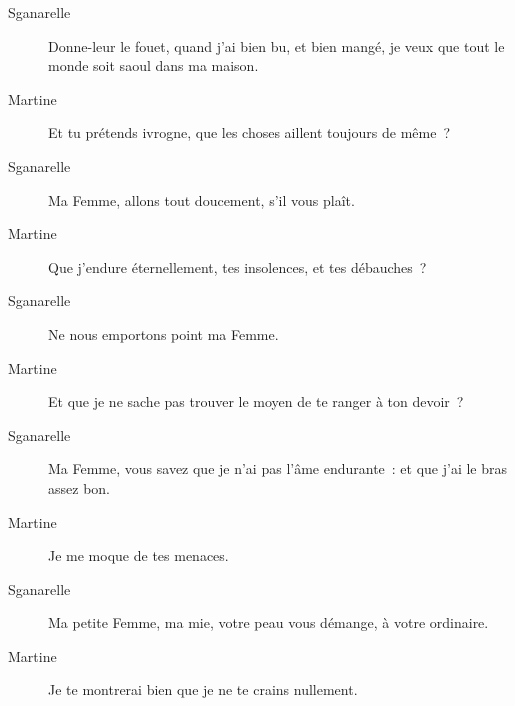\documentclass[french,twoside]{book} %
\begin{document}
 \begin{description} \item[Sganarelle] 

Donne-leur le fouet, quand j’ai bien bu, et bien mangé, je veux que tout le monde soit saoul dans ma maison.\end{description}
 \begin{description} \item[Martine] 

Et tu prétends ivrogne, que les choses aillent toujours de même ?\end{description}
 \begin{description} \item[Sganarelle] 

Ma Femme, allons tout doucement, s’il vous plaît.\end{description}
 \begin{description} \item[Martine] 

Que j’endure éternellement, tes insolences, et tes débauches ?\end{description}
 \begin{description} \item[Sganarelle] 

Ne nous emportons point ma Femme.\end{description}
 \begin{description} \item[Martine] 

Et que je ne sache pas trouver le moyen de te ranger à ton devoir ?\end{description}
 \begin{description} \item[Sganarelle] 

Ma Femme, vous savez que je n’ai pas l’âme endurante : et que j’ai le bras assez bon.\end{description}
 \begin{description} \item[Martine] 

Je me moque de tes menaces.\end{description}
 \begin{description} \item[Sganarelle] 

Ma petite Femme, ma mie, votre peau vous démange, à votre ordinaire.\end{description}
 \begin{description} \item[Martine] 

Je te montrerai bien que je ne te crains nullement.\end{description}
\end{document}
